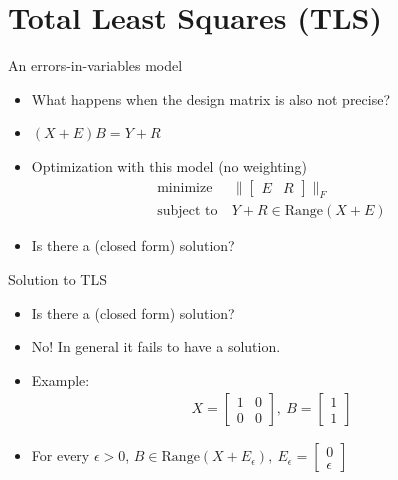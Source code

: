 \documentclass[handout]{beamer}
\begin{document}
\section{Total Least Squares (TLS)}
%
\begin{frame}{An errors-in-variables model}
\begin{itemize}
\item What happens when the design matrix is also not precise?
\item $(X + E)B = Y + R$
\item Optimization with this model (no weighting)
\begin{equation}
\begin{aligned}
\text{minimize} &\ \|\begin{bmatrix} E & R\end{bmatrix}\|_{F} \\
\text{subject to} &\ Y + R \in \text{Range}(X + E)
\end{aligned}
\end{equation}
\item Is there a (closed form) solution?
\end{itemize}
\end{frame}
%
\begin{frame}{Solution to TLS}
\begin{itemize}
\item Is there a (closed form) solution?
\item No! In general it fails to have a solution.
\item Example:
\begin{equation}
\begin{aligned}
X = \begin{bmatrix}
   1 & 0 \\ 0 & 0
 \end{bmatrix}, \ B = \begin{bmatrix}
 1 \\ 1
 \end{bmatrix} 
\end{aligned}
\end{equation}
\item For every $\epsilon > 0$, $B \in \text{Range}(X + E_{\epsilon}), \ E_{\epsilon} = \begin{bmatrix} 0 \\ \epsilon \end{bmatrix}$
\end{itemize}
\end{frame}
%
\end{document}
